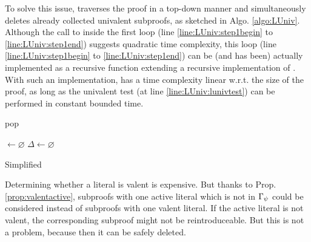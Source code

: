 \documentclass{llncs}
\begin{document}
To solve this issue, {\LowerUnivalents} traverses the proof in a top-down manner and
simultaneously deletes already collected univalent subproofs, as sketched in Algo. \ref{algo:LUniv}.
Although the call to  inside the first loop (line \ref{line:LUniv:step1begin} to
\ref{line:LUniv:step1end}) suggests quadratic time complexity, this loop (line
\ref{line:LUniv:step1begin} to \ref{line:LUniv:step1end}) can be (and has been) actually implemented
as a recursive function extending a recursive implementation of . With such an
implementation, {\LowerUnivalents} has a time complexity linear w.r.t. the size of the proof, as
long as the univalent test (at line \ref{line:LUniv:lunivtest}) can be performed in constant bounded
time.



\begin{algorithm}[bt]
  \BlankLine

   {pop}

  \Univ $\leftarrow \varnothing$ \;
  $\Delta \leftarrow \varnothing$ \;
  \BlankLine

  \BlankLine


  \caption{Simplified \LowerUnivalents}
  \label{algo:LUniv}
\end{algorithm}

Determining whether a literal is valent is expensive. But thanks to Prop. \ref{prop:valentactive},
subproofs with one active literal which is not in $\Gamma_{\psi}$ could be considered instead
of subproofs with one valent literal.  If the active literal is not valent, the corresponding
subproof might not be reintroduceable. But this is not a problem, because then it can be safely deleted.
\end{document}
